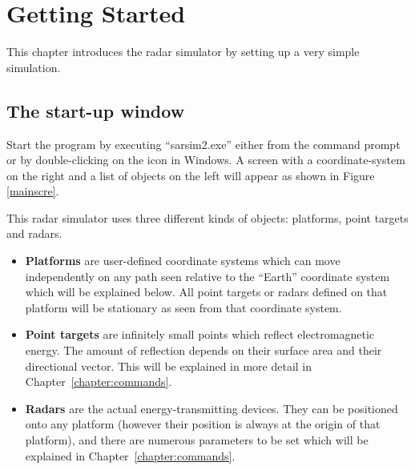                       

\chapter{Getting Started\label{chapter:start}}

This chapter introduces the radar simulator by setting up a very simple
simulation.

\section{The start-up window\label{chapter:quickstart}}

Start the program by executing ``sarsim2.exe'' either from the command
prompt or by double-clicking on the icon in Windows. A screen with a
coordinate-system on the right and a list of objects on the left will appear
as shown in Figure \ref{mainscre}.


This radar simulator uses three different kinds of objects: platforms, point
targets and radars.

\begin{itemize}
\item  \textbf{Platforms} are user-defined coordinate systems which can move
independently on any path seen relative to the ``Earth'' coordinate system
which will be explained below. All point targets or radars defined on that
platform will be stationary as seen from that coordinate system.

\item  \textbf{Point targets }are infinitely small points which reflect
electromagnetic energy. The amount of reflection depends on their surface
area and their directional vector. This will be explained in more detail in
Chapter~\ref{chapter:commands}.

\item  \textbf{Radars} are the actual energy-transmitting devices. They can
be positioned onto any platform (however their position is always at the
origin of that platform), and there are numerous parameters to be set which
will be explained in Chapter~\ref{chapter:commands}.
\end{itemize}

